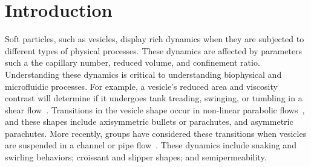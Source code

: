 \documentclass[twoside,twocolumn,9pt]{article}
\begin{document}
\renewcommand*\rmdefault{bch}\normalfont\upshape
\rmfamily
\section*{}
\vspace{-1cm}








\section{\label{sec:Introduction}Introduction}
Soft particles, such as vesicles, display rich dynamics when they are subjected to different types of physical processes. These dynamics are affected by parameters such a the capillary number, reduced volume, and confinement ratio. Understanding these dynamics is critical to understanding biophysical and microfluidic processes. For example, a vesicle's reduced area and viscosity contrast will determine if it undergoes tank treading, swinging, or tumbling in a shear flow~\cite{nog-gom2005}. Transitions in the vesicle shape occur in non-linear parabolic flows~\cite{kao-bir-mis2009, dan-vla-mis2009}, and these shapes include axisymmetric bullets or parachutes, and asymmetric parachutes. More recently, groups have considered these transitions when vesicles are suspended in a channel or pipe flow~\cite{lyu-che-far-jae-mis-leo2023, aga-bir2020, qua-gan-you2021, abb-far-nai-ezz-ben-mis2022}. These dynamics include snaking and swirling behaviors; croissant and slipper shapes; and semipermeability.
\end{document}
